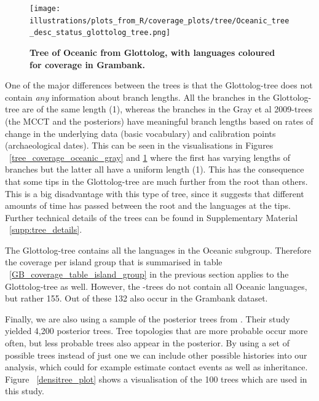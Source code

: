 \documentclass[a4paper,10pt]{article} %
\begin{document}
\begin{figure}[H]
\centering
\texttt{[image: illustrations/plots\_from\_R/coverage\_plots/tree/Oceanic\_tree\_desc\_status\_glottolog\_tree.png]}
\caption{\textbf{Tree of Oceanic from Glottolog, with languages coloured for coverage in Grambank.}}
\label{tree_coverage_oceanic_glottolog}
\end{figure}

One of the major differences between the trees is that the Glottolog-tree does not contain \emph{any} information about branch lengths. All the branches in the Glottolog-tree are of the same length (1), whereas the branches in the Gray et al 2009-trees (the MCCT and the posteriors) have meaningful branch lengths based on rates of change in the underlying data (basic vocabulary) and calibration points (archaeological dates). This can be seen in the visualisations in Figures ~\ref{tree_coverage_oceanic_gray} and \ref{tree_coverage_oceanic_glottolog} where the first has varying lengths of branches but the latter all have a uniform length (1). This has the consequence that some tips in the Glottolog-tree are much further from the root than others. This is a big disadvantage with this type of tree, since it suggests that different amounts of time has passed between the root and the languages at the tips. Further technical details of the trees can be found in Supplementary Material ~\ref{supp:tree_details}.

The Glottolog-tree contains all the languages in the Oceanic subgroup. Therefore the coverage per island group that is summarised in table ~\ref{GB_coverage_table_island_group} in the previous section applies to the Glottolog-tree as well. However, the \cite{grayetal_2009}-trees do not contain all Oceanic languages, but rather 155. Out of these 132 also occur in the Grambank dataset. %

Finally, we are also using a sample of the posterior trees from \cite{grayetal_2009}. Their study yielded 4,200 posterior trees. Tree topologies that are more probable occur more often, but less probable trees also appear in the posterior. By using a set of possible trees instead of just one we can include other possible histories into our analysis, which could for example estimate contact events as well as inheritance. Figure ~\ref{densitree_plot} shows a visualisation of the 100 trees which are used in this study.
\end{document}
